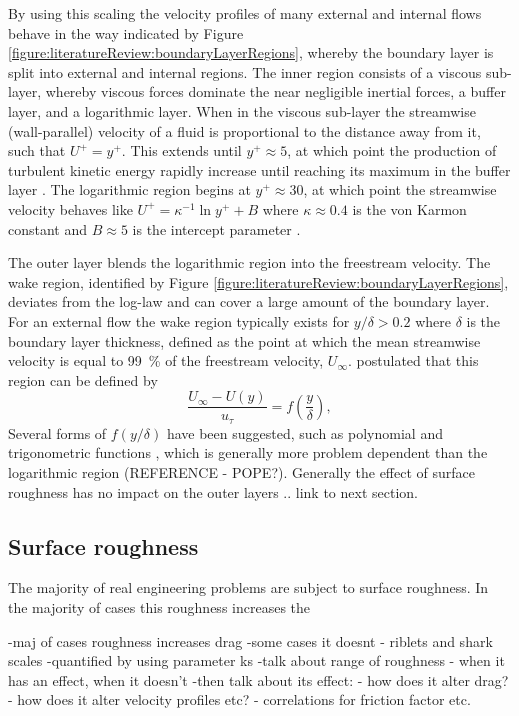 \documentclass[12pt,oneside,a4paper]{article}
\begin{document}
By using this scaling the velocity profiles of many external and internal flows behave in the way indicated by Figure \ref{figure:literatureReview:boundaryLayerRegions}, whereby the boundary layer is split into external and internal regions. The inner region consists of a viscous sub-layer, whereby viscous forces dominate the near negligible inertial forces, a buffer layer, and a logarithmic layer. When in the viscous sub-layer the streamwise (wall-parallel) velocity of a fluid is proportional to the distance away from it, such that $U^+ = y^+$. This extends until $y^+ \approx 5$, at which point the production of turbulent kinetic energy rapidly increase until reaching its maximum in the buffer layer \citep{perlin2016}. The logarithmic region begins at $y^+ \approx 30$, at which point the streamwise velocity behaves like $U^+ = \kappa^{-1} \ln{y^+} + B$ where $\kappa \approx 0.4$ is the von Karmon constant and $B\approx 5$ is the intercept parameter \citep{pope2001}.

The outer layer blends the logarithmic region into the freestream velocity. The wake region, identified by Figure \ref{figure:literatureReview:boundaryLayerRegions}, deviates from the log-law and can cover a large amount of the boundary layer. For an external flow the wake region typically exists for $y/\delta > 0.2$ where $\delta$ is the boundary layer thickness, defined as the point at which the mean streamwise velocity is equal to \SI{99}{\%} of the freestream velocity, $U_\infty$. \cite{coles1956} postulated that this region can be defined by
\begin{equation}
\frac{U_\infty - U(y)}{u_\tau} = f \left( \frac{y}{\delta} \right),
\end{equation}
Several forms of $f(y/\delta)$ have been suggested, such as polynomial and trigonometric functions \citep{perlin2016}, which is generally more problem dependent than the logarithmic region (REFERENCE - POPE?). Generally the effect of surface roughness has no impact on the outer layers .. link to next section.

\subsection{Surface roughness}
The majority of real engineering problems are subject to surface roughness. In the majority of cases this roughness increases the 

\citep{nikuradse1933}

-maj of cases roughness increases drag
-some cases it doesnt - riblets and shark scales
-quantified by using parameter ks
-talk about range of roughness - when it has an effect, when it doesn't
-then talk about its effect:
	-	how does it alter drag?
	-	how does it alter velocity profiles etc?
	-	correlations for friction factor etc. 
\end{document}
